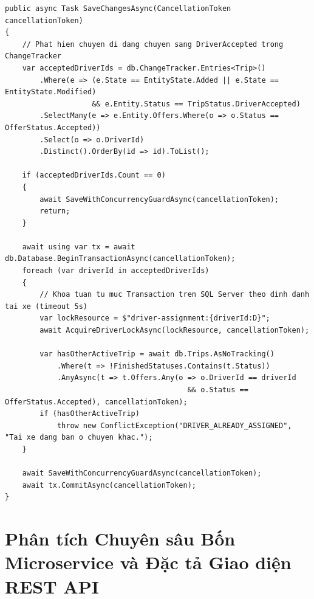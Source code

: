 \documentclass[12pt,a4paper]{article}
\begin{document}
\begin{lstlisting}[caption={Ket hop SQL Server sp\_getapplock va RowVersion de ngan chan gan trung tai xe}]
public async Task SaveChangesAsync(CancellationToken cancellationToken)
{
    // Phat hien chuyen di dang chuyen sang DriverAccepted trong ChangeTracker
    var acceptedDriverIds = db.ChangeTracker.Entries<Trip>()
        .Where(e => (e.State == EntityState.Added || e.State == EntityState.Modified)
                    && e.Entity.Status == TripStatus.DriverAccepted)
        .SelectMany(e => e.Entity.Offers.Where(o => o.Status == OfferStatus.Accepted))
        .Select(o => o.DriverId)
        .Distinct().OrderBy(id => id).ToList();

    if (acceptedDriverIds.Count == 0)
    {
        await SaveWithConcurrencyGuardAsync(cancellationToken);
        return;
    }

    await using var tx = await db.Database.BeginTransactionAsync(cancellationToken);
    foreach (var driverId in acceptedDriverIds)
    {
        // Khoa tuan tu muc Transaction tren SQL Server theo dinh danh tai xe (timeout 5s)
        var lockResource = $"driver-assignment:{driverId:D}";
        await AcquireDriverLockAsync(lockResource, cancellationToken);

        var hasOtherActiveTrip = await db.Trips.AsNoTracking()
            .Where(t => !FinishedStatuses.Contains(t.Status))
            .AnyAsync(t => t.Offers.Any(o => o.DriverId == driverId
                                          && o.Status == OfferStatus.Accepted), cancellationToken);
        if (hasOtherActiveTrip)
            throw new ConflictException("DRIVER_ALREADY_ASSIGNED", "Tai xe dang ban o chuyen khac.");
    }

    await SaveWithConcurrencyGuardAsync(cancellationToken);
    await tx.CommitAsync(cancellationToken);
}
\end{lstlisting}

\section{Phân tích Chuyên sâu Bốn Microservice và Đặc tả Giao diện REST API}
\end{document}
